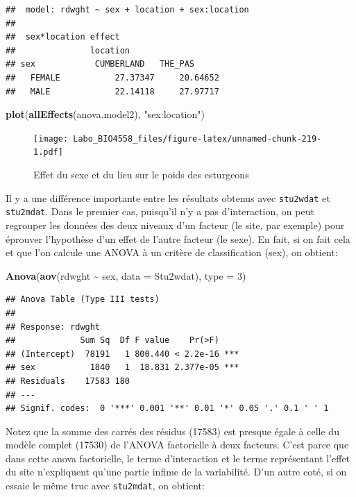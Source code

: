 \documentclass[
  12pt,
]{book}
\newenvironment{Shaded}{\begin{snugshade}}{\end{snugshade}}
\newcommand{\DataTypeTok}[1]{\textcolor[rgb]{0.13,0.29,0.53}{#1}}
\newcommand{\DecValTok}[1]{\textcolor[rgb]{0.00,0.00,0.81}{#1}}
\newcommand{\KeywordTok}[1]{\textcolor[rgb]{0.13,0.29,0.53}{\textbf{#1}}}
\newcommand{\NormalTok}[1]{#1}
\newcommand{\OperatorTok}[1]{\textcolor[rgb]{0.81,0.36,0.00}{\textbf{#1}}}
\newcommand{\StringTok}[1]{\textcolor[rgb]{0.31,0.60,0.02}{#1}}
\begin{document}
\begin{verbatim}
##  model: rdwght ~ sex + location + sex:location
## 
##  sex*location effect
##               location
## sex            CUMBERLAND   THE_PAS     
##   FEMALE           27.37347     20.64652
##   MALE             22.14118     27.97717
\end{verbatim}

\begin{Shaded}
\begin{Highlighting}[]
\KeywordTok{plot}\NormalTok{(}\KeywordTok{allEffects}\NormalTok{(anova.model2), }\StringTok{"sex:location"}\NormalTok{)}
\end{Highlighting}
\end{Shaded}

\begin{figure}
\centering
\texttt{[image: Labo\_BIO4558\_files/figure-latex/unnamed-chunk-219-1.pdf]}
\caption{\label{fig:unnamed-chunk-219}Effet du sexe et du lieu sur le poids des esturgeons}
\end{figure}

Il y a une différence importante entre les résultats obtenus avec \texttt{stu2wdat} et \texttt{stu2mdat}. Dans le premier cas, puisqu'il n'y a pas d'interaction, on peut regrouper les données des deux niveaux d'un facteur (le site, par exemple) pour éprouver l'hypothèse d'un effet de l'autre facteur (le sexe). En fait, si on fait cela et que l'on calcule une ANOVA à un critère de classification (sex), on obtient:

\begin{Shaded}
\begin{Highlighting}[]
\KeywordTok{Anova}\NormalTok{(}\KeywordTok{aov}\NormalTok{(rdwght }\OperatorTok{\textasciitilde{}}\StringTok{ }\NormalTok{sex, }\DataTypeTok{data =}\NormalTok{ Stu2wdat), }\DataTypeTok{type =} \DecValTok{3}\NormalTok{)}
\end{Highlighting}
\end{Shaded}

\begin{verbatim}
## Anova Table (Type III tests)
## 
## Response: rdwght
##             Sum Sq  Df F value    Pr(>F)    
## (Intercept)  78191   1 800.440 < 2.2e-16 ***
## sex           1840   1  18.831 2.377e-05 ***
## Residuals    17583 180                      
## ---
## Signif. codes:  0 '***' 0.001 '**' 0.01 '*' 0.05 '.' 0.1 ' ' 1
\end{verbatim}

Notez que la somme des carrés des résidus (17583) est presque égale à celle du modèle complet (17530) de l'ANOVA factorielle à deux facteurs. C'est parce que dans cette anova factorielle, le terme d'interaction et le terme représentant l'effet du site n'expliquent qu'une partie infime de la variabilité. D'un autre coté, si on essaie le même truc avec \texttt{stu2mdat}, on obtient:
\end{document}
